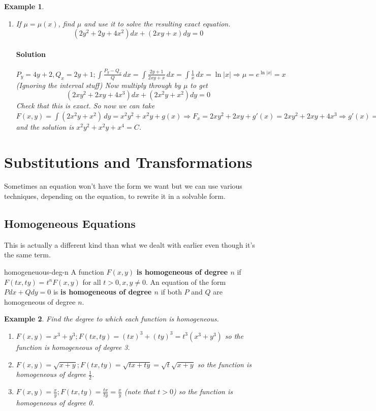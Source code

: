 \documentclass[letterpaper, 11pt, openany]{book}
\theoremstyle{mytheoremstyle}
\theoremstyle{myexamplestyle}
\newtheorem{example}{Example}[section]
\newenvironment{solution}{\paragraph{\sffamily \smaller \fontseries{b}\selectfont Solution}}{\hfill\faSquare}
\begin{document}
\begin{example}
    \begin{enumerate}
        \item If \(\mu = \mu(x)\), find \(\mu\) and use it to solve the resulting exact equation.
        \[(2y^{2} + 2y + 4x^{2})dx + (2xy + x)dy = 0\]
        \begin{solution}
            \(\displaystyle P_{y} = 4y+2, Q_{x} = 2y+1; \int \frac{P_{y} - Q_{x}}{Q} \, dx = \int \frac{2y+1}{2xy + x}\, dx = \int \frac{1}{x}\, dx = \ln |x| \Rightarrow \mu = e^{\ln |x|} = x\) (Ignoring the interval stuff) Now multiply through by \(\mu\) to get
            \[(2xy^{2} + 2xy + 4x^{3})dx + (2x^{2}y + x^{2})dy = 0\]
            Check that this is exact. So now we can take \(\displaystyle F(x,y) = \int \left(2x^{2}y + x^{2}\right)\, dy = x^{2}y^{2}+x^{2}y + g(x) \Rightarrow F_{x} = 2xy^{2} + 2xy + g'(x) = 2xy^{2} + 2xy + 4x^{3} \Rightarrow g'(x) = 4x^{3} \Rightarrow g(x) = x^{4}\) and the solution is \(x^{2}y^{2}+x^{2}y + x^{4} = C\).
        \end{solution}
    \end{enumerate}
\end{example}

\section{Substitutions and Transformations}
\setcounter{figure}{0}
Sometimes an equation won't have the form we want but we can use various techniques, depending on the equation, to rewrite it in a solvable form.

\subsection{Homogeneous Equations}
This is actually a different kind than what we dealt with earlier even though it's the same term.
\begin{definition}{}{homogeneuous-deg-n}
    A function \(F(x,y)\) \textbf{is homogeneous of degree \(n\)} if \(F(tx, ty) = t^{n} F(x,y)\) for all \(t>0, x,y \neq 0\). An equation of the form \(P dx + Q dy = 0\) is \textbf{is homogeneous of degree \(n\)} if both \(P\) and \(Q\) are homogeneous of degree \(n\).
\end{definition}

\begin{example}\label{e:de-homogeneous-deg-n}
    Find the degree to which each function is homogeneous.
    \begin{enumerate}
        \item \(F(x,y) = x^{3} + y^{3}; F(tx, ty) = (tx)^{3} + (ty)^{3} = t^{3}(x^{3} + y^{3})\) so the function is homogeneous of degree 3.
        \item \(F(x,y) = \sqrt{x+y}; F(tx, ty) = \sqrt{tx + ty} = \sqrt{t}\sqrt{x+y}\) so the function is homogeneous of degree \(\frac{1}{2}\).
        \item \(F(x,y) = \frac{x}{y}; F(tx, ty) = \frac{tx}{ty} = \frac{x}{y}\) (note that \(t>0\)) so the function is homogeneous of degree 0.
    \end{enumerate}
\end{example}
\end{document}
